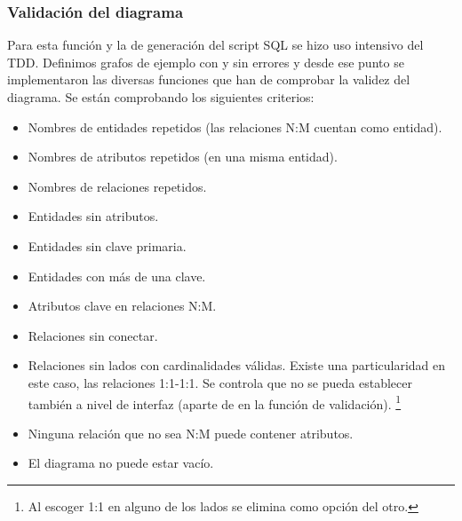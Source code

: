 \subsubsection{Validación del diagrama}
Para esta función y la de generación del script SQL se hizo uso intensivo del TDD.
Definimos grafos de ejemplo con y sin errores y desde ese punto se implementaron las diversas funciones que han de comprobar la validez del diagrama.
Se están comprobando los siguientes criterios:
\begin{itemize}
\tightlist
    \item Nombres de entidades repetidos (las relaciones N:M cuentan como entidad).
    \item Nombres de atributos repetidos (en una misma entidad).
    \item Nombres de relaciones repetidos.
    \item Entidades sin atributos.
    \item Entidades sin clave primaria.
    \item Entidades con más de una clave.
    \item Atributos clave en relaciones N:M.
    \item Relaciones sin conectar.
    \item Relaciones sin lados con cardinalidades válidas. Existe una particularidad en este caso, las relaciones 1:1-1:1. Se controla que no se pueda establecer también a nivel de interfaz (aparte de en la función de validación). \footnote{Al escoger 1:1 en alguno de los lados se elimina como opción del otro.}
    \item Ninguna relación que no sea N:M puede contener atributos.
    \item El diagrama no puede estar vacío.
\end{itemize}

